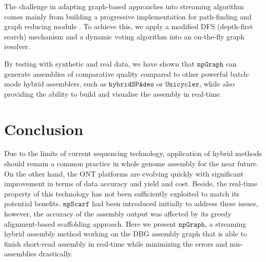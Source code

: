\documentclass[10pt,letterpaper]{article}
\newcommand{\npscarf}{$\mathtt{npScarf}$}
\newcommand{\npgraph}{$\mathtt{npGraph}$}
\newcommand{\unicycler}{$\mathtt{Unicycler}$}
\begin{document}
The challenge in adapting graph-based  approaches into streaming algorithm comes mainly from building a progressive implementation for path-finding and graph reducing module . 
To achieve this, we apply a modified DFS (depth-first search) mechanism and a dynamic voting algorithm into an on-the-fly graph resolver.
 
By testing with synthetic and real data, we have shown that \npgraph{} can generate assemblies of comparative quality compared to other powerful batch-mode hybrid assemblers, such as $\mathtt{hybridSPAdes}$ or \unicycler{}, while also providing the ability to build and visualise the assembly in real-time. 




\section*{Conclusion}  %
Due to the limits of current sequencing technology, application of hybrid methods should remain a common practice in whole genome assembly for the near future.
On the other hand, the ONT platforms are evolving quickly with significant improvement in terms of data accuracy and yield and cost. Beside, the real-time property of this technology has not been sufficiently exploited to match its potential benefits.
\npscarf{} had been introduced initially to address these issues, however, the accuracy of the assembly output was affected by its greedy alignment-based scaffolding approach.
Here we present \npgraph{}, a streaming hybrid assembly method working on the DBG assembly graph that is able to finish short-read assembly in real-time while minimizing the errors and mis-assemblies drastically.
\end{document}
